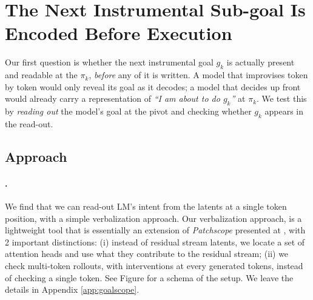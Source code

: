 \section{The Next Instrumental Sub-goal Is Encoded Before Execution}
\label{sec:what}

Our first question is whether the next instrumental goal $g_k$ is actually present and readable at the \pivot $\pi_k$, \emph{before} any of it is written. A model that improvises token by token would only reveal its goal as it decodes; a model that decides up front would already carry a representation of \textit{``I am about to do $g_k$''} at $\pi_k$. We test this by \emph{reading out} the model's goal at the pivot and checking whether $g_k$ appears in the read-out.

\subsection{Approach}
\label{sec:what:approach}

\paragraph{\goalscope.} 

We find that we can read-out LM's intent from the latents at a single token position, with a simple verbalization approach. Our verbalization approach, \goalscope is a lightweight tool that is essentially an extension of \emph{Patchscope} presented at \cite{ghandeharioun2024patchscope}, with 2 important distinctions: (i) instead of residual stream latents, we locate a set of attention heads and use what they contribute to the residual stream; (ii) we check multi-token rollouts, with interventions at every generated tokens, instead of checking a single token. See {\color{red} Figure } for a schema of the setup. We leave the details in Appendix \ref{app:goalscope}.

